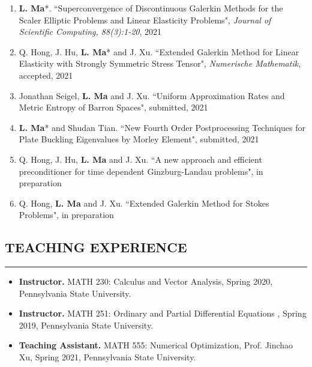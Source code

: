 \documentclass[10pt,a4]{article}
\begin{document}
\begin{small}
\begin{enumerate}
	\item \textbf{L. Ma}*. ``Superconvergence of Discontinuous Galerkin Methods for the Scaler Elliptic Problems and Linear Elasticity Problems", {\it Journal of Scientific Computing, 88(3):1-20}, 2021

	\item Q. Hong, J. Hu, \textbf{L. Ma}* and J. Xu. ``Extended Galerkin Method for Linear Elasticity with Strongly Symmetric Stress Tensor",  {\it Numerische Mathematik}, accepted, 2021
	
	\item Jonathan Seigel, \textbf{L. Ma} and J. Xu. ``Uniform Approximation Rates and Metric Entropy of Barron Spaces", submitted, 2021
	
	\item \textbf{L. Ma}* and Shudan Tian. ``New Fourth Order Postprocessing Techniques for Plate Buckling Eigenvalues by Morley Element", submitted, 2021%
	
	\item Q. Hong, J. Hu, \textbf{L. Ma} and J. Xu. ``A new approach and efficient preconditioner for time dependent Ginzburg-Landau problems", in preparation
	
	\item Q. Hong, \textbf{L. Ma} and J. Xu. ``Extended Galerkin Method for Stokes Problems", in preparation
    
\end{enumerate}

\subsection*{TEACHING EXPERIENCE}
\hrule
\vspace{0.2cm}

\begin{itemize}

\item {\bf Instructor.} MATH 230:  Calculus and Vector Analysis, Spring 2020, Pennsylvania State University. 

\item {\bf Instructor.} MATH 251: Ordinary and Partial Differential Equations , Spring 2019, Pennsylvania State University.

\item {\bf Teaching Assistant.} MATH 555: Numerical Optimization, Prof. Jinchao Xu, Spring 2021, Pennsylvania State University.


\end{itemize}
\end{small}
\end{document}
